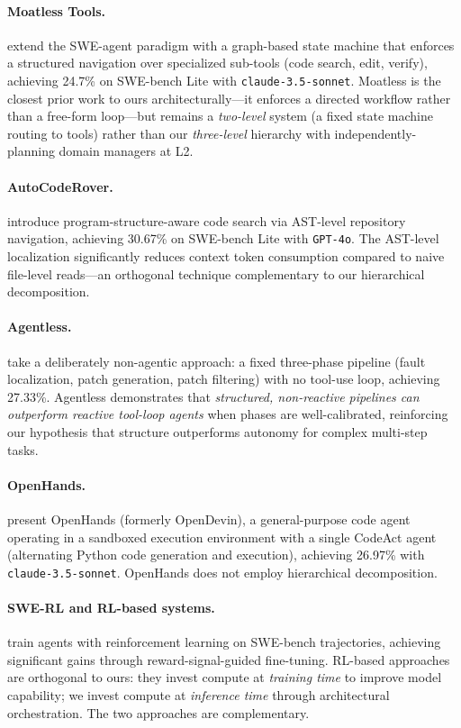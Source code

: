 \paragraph{Moatless Tools.}
\citet{orwall2024moatless} extend the SWE-agent paradigm with a
graph-based state machine that enforces a structured navigation over
specialized sub-tools (code search, edit, verify), achieving 24.7\% on
SWE-bench Lite with \texttt{claude-3.5-sonnet}. Moatless is the closest
prior work to ours architecturally---it enforces a directed workflow rather
than a free-form loop---but remains a \emph{two-level} system (a fixed
state machine routing to tools) rather than our \emph{three-level} hierarchy
with independently-planning domain managers at L2.

\paragraph{AutoCodeRover.}
\citet{zhang2024autocoderover} introduce program-structure-aware code search
via AST-level repository navigation, achieving 30.67\% on SWE-bench Lite
with \texttt{GPT-4o}. The AST-level localization significantly reduces
context token consumption compared to naive file-level reads---an orthogonal
technique complementary to our hierarchical decomposition.

\paragraph{Agentless.}
\citet{xia2024agentless} take a deliberately non-agentic approach: a fixed
three-phase pipeline (fault localization, patch generation, patch filtering)
with no tool-use loop, achieving 27.33\%. Agentless demonstrates that
\emph{structured, non-reactive pipelines can outperform reactive tool-loop
agents} when phases are well-calibrated, reinforcing our hypothesis that
structure outperforms autonomy for complex multi-step tasks.

\paragraph{OpenHands.}
\citet{wang2024opendevin} present OpenHands (formerly OpenDevin), a
general-purpose code agent operating in a sandboxed execution environment
with a single CodeAct agent (alternating Python code generation and
execution), achieving 26.97\% with \texttt{claude-3.5-sonnet}. OpenHands
does not employ hierarchical decomposition.

\paragraph{SWE-RL and RL-based systems.}
\citet{luo2025swerl} train agents with reinforcement learning on SWE-bench
trajectories, achieving significant gains through reward-signal-guided
fine-tuning. RL-based approaches are orthogonal to ours: they invest compute
at \emph{training time} to improve model capability; we invest compute at
\emph{inference time} through architectural orchestration. The two approaches
are complementary.

